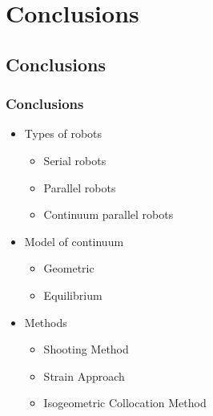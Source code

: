 \documentclass[compress]{thesisbeamer}
\begin{document}
  	\section{Conclusions}
      	\subsection{Conclusions}
        \begin{frame}
        	\frametitle{Conclusions}
        	\begin{itemize}
        		\item Types of robots
        		\begin{itemize}
        			\item Serial robots
        			\item Parallel robots
        			\item Continuum parallel robots
        		\end{itemize}
        		\item Model of continuum
       		 	\begin{itemize}
        			\item Geometric
        			\item Equilibrium
        		\end{itemize}
        		\item Methods
        		\begin{itemize}
        			\item Shooting Method
       		 		\item Strain Approach
       		 		\item Isogeometric Collocation Method
        		\end{itemize}
        	\end{itemize}
        \end{frame}
        	
\end{document}
